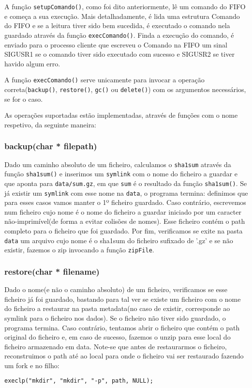 A função \texttt{setupComando()}, como foi dito anteriormente, lê um comando do FIFO e começa a sua execução. Mais detalhadamente, é lida uma estrutura 
Comando do FIFO e se a leitura tiver sido bem sucedida, é executado o comando nela guardado através da função \texttt{execComando()}. Finda a execução do comando,
é enviado para o processo cliente que escreveu o Comando na FIFO um sinal SIGUSR1 se o comando tiver sido executado com sucesso e SIGUSR2 se tiver havido algum
erro.

A função \texttt{execComando()} serve unicamente para invocar a operação correta(\texttt{backup()}, \texttt{restore()}, \texttt{gc()} ou \texttt{delete()})
com os argumentos necessários, se for o caso.

As operações suportadas estão implementadas, através de funções com o nome respetivo, da seguinte maneira:
\subsubsection{backup(char * filepath)}
Dado um caminho absoluto de um ficheiro, calculamos o \texttt{sha1sum} através da função \texttt{sha1sum()} e inserimos um \texttt{symlink} com o nome do ficheiro a guardar e que aponta
para \texttt{data/sum.gz}, em que \texttt{sum} é o resultado da função \texttt{sha1sum()}. Se já existir um \texttt{symlink} com esse nome na \texttt{data},
o programa termina: definimos que para esses casos vamos manter o 1º ficheiro guardado. Caso contrário, escrevemos num ficheiro cujo nome é o nome do ficheiro a 
guardar iniciado por um caracter não-imprimível(de forma a evitar colisões de nomes). Esse ficheiro contém o path completo para o ficheiro que foi guardado.
Por fim, verificamos se exite na pasta \texttt{data} um arquivo cujo nome é o sha1sum do ficheiro sufixado de '.gz' e se não existir, fazemos o zip invocando a função \texttt{zipFile}.

\subsubsection{restore(char * filename)}
Dado o nome(e não o caminho absoluto) de um ficheiro, verificamos se esse ficheiro já foi guardado, bastando para tal ver se existe um ficheiro com
o nome do ficheiro a restaurar na pasta metadata(no caso de existir, corresponde ao symlink para o ficheiro nos dados). Se o ficheiro não tiver sido guardado, o programa termina.
Caso contrário, tentamos abrir o ficheiro que contém o path original do ficheiro e, em caso de sucesso, fazemos o unzip para esse local do ficheiro 
armazenado em data. Note-se que antes de restaurarmos o ficheiro, reconstruimos o path até ao local para onde o ficheiro vai ser restaurado
fazendo um fork e no filho:
\begin{verbatim}
execlp("mkdir", "mkdir", "-p", path, NULL);
\end{verbatim}

